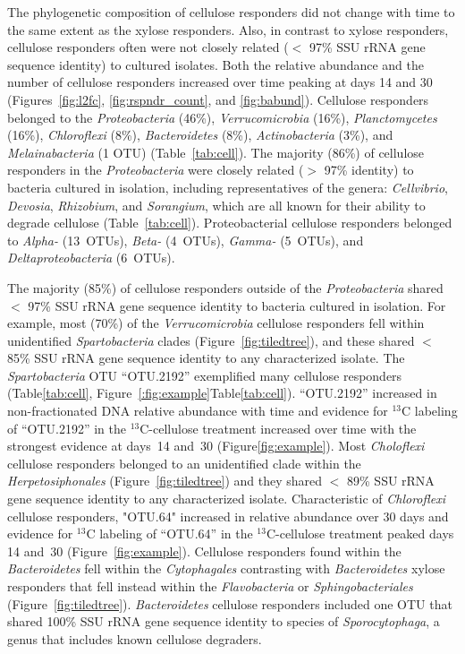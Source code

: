 The phylogenetic composition of cellulose responders did not change with time
to the same extent as the xylose responders. Also, in contrast to xylose
responders, cellulose responders often were not closely related ($<$ 97\% SSU
rRNA gene sequence identity) to cultured isolates. Both the relative abundance
and the number of cellulose responders increased over time peaking at days 14
and 30 (Figures~\ref{fig:l2fc}, \ref{fig:rspndr_count}, and \ref{fig:babund}).
Cellulose responders belonged to the \textit{Proteobacteria} (46\%),
\textit{Verrucomicrobia} (16\%), \textit{Planctomycetes} (16\%),
\textit{Chloroflexi} (8\%), \textit{Bacteroidetes} (8\%),
\textit{Actinobacteria} (3\%), and \textit{Melainabacteria} (1 OTU)
(Table~\ref{tab:cell}). The majority (86\%) of cellulose responders in the
\textit{Proteobacteria} were closely related ($>$ 97\% identity) to bacteria
cultured in isolation, including representatives of the genera:
\textit{Cellvibrio}, \textit{Devosia}, \textit{Rhizobium}, and
\textit{Sorangium}, which are all known for their ability to degrade cellulose
(Table~\ref{tab:cell}). Proteobacterial cellulose responders belonged to
\textit{Alpha-} (13~OTUs), \textit{Beta-} (4~OTUs), \textit{Gamma-} (5~OTUs),
and \textit{Deltaproteobacteria} (6~OTUs). 

The majority (85\%) of cellulose responders outside of the
\textit{Proteobacteria} shared  $<$ 97\% SSU rRNA gene sequence identity to
bacteria cultured in isolation. For example, most (70\%) of the
\textit{Verrucomicrobia} cellulose responders fell within unidentified
\textit{Spartobacteria} clades (Figure~\ref{fig:tiledtree}), and these shared $<$
85\% SSU rRNA gene sequence identity to any characterized isolate. The
\textit{Spartobacteria} OTU ``OTU.2192'' exemplified many cellulose responders
(Table\ref{tab:cell}, Figure~\ref{:fig:example}Table\ref{tab:cell}).
``OTU.2192'' increased in non-fractionated DNA relative abundance with time and
evidence for $^{13}$C labeling of ``OTU.2192'' in the $^{13}$C-cellulose
treatment increased over time with the strongest evidence at days~14 and~30
(Figure\ref{fig:example}). Most \textit{Choloflexi} cellulose responders
belonged to an unidentified clade within the \textit{Herpetosiphonales}
(Figure~\ref{fig:tiledtree}) and they shared $<$ 89\% SSU rRNA gene sequence
identity to any characterized isolate. Characteristic of \textit{Chloroflexi}
cellulose responders, "OTU.64" increased in relative abundance over 30 days and
evidence for $^{13}$C labeling of ``OTU.64'' in the $^{13}$C-cellulose
treatment peaked days 14 and~30 (Figure~\ref{fig:example}). Cellulose
responders found within the \textit{Bacteroidetes} fell within the
\textit{Cytophagales} contrasting with \textit{Bacteroidetes} xylose responders
that fell instead within the \textit{Flavobacteria} or
\textit{Sphingobacteriales} (Figure~\ref{fig:tiledtree}).
\textit{Bacteroidetes} cellulose responders included one OTU that shared 100\%
SSU rRNA gene sequence identity to species of \textit{Sporocytophaga}, a genus
that includes known cellulose degraders.

